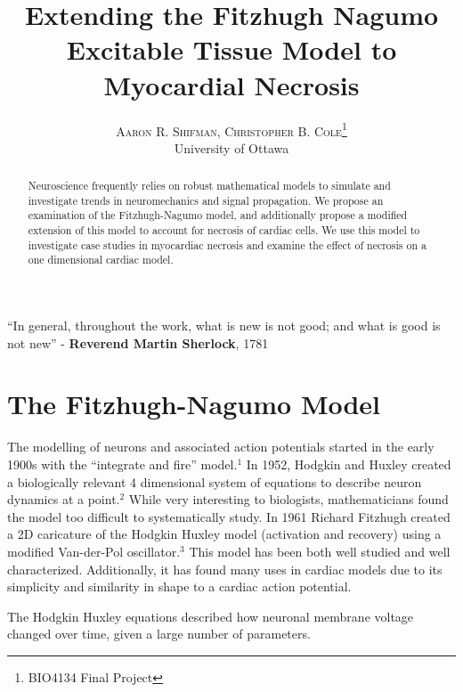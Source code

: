 \documentclass[11pt]{report}
\title{\vspace{-15mm}\fontsize{24pt}{10pt}\selectfont\textbf{Extending the Fitzhugh Nagumo Excitable Tissue Model to Myocardial Necrosis}} %
\author{
\large
\textsc{Aaron R. Shifman, Christopher B. Cole}\thanks{BIO4134 Final Project}\\[2mm] %
\normalsize University of Ottawa \\ %
\vspace{-5mm}
}
\date{}
\newenvironment{dedication}
  {\clearpage           %
   \thispagestyle{empty}%
   \vspace*{\stretch{1}}%
   \itshape             %
   \raggedleft          %
  }
  {\par %
   \vspace{\stretch{3}} %
   \clearpage           %
  }
\begin{document}
\maketitle %

\thispagestyle{fancy} %


\begin{dedication}
``In general, throughout the work, what is new is not good; and what is good is not new'' - \textbf{Reverend Martin Sherlock}, 1781 
\end{dedication}

\begin{abstract}

Neuroscience frequently relies on robust mathematical models to simulate and investigate trends in neuromechanics and signal propagation. We propose an examination of the Fitzhugh-Nagumo model, and additionally propose a modified extension of this model to account for necrosis of cardiac cells. We use this model to investigate case studies in myocardiac necrosis and examine the effect of necrosis on a one dimensional cardiac model. 
\end{abstract}


\newpage

\tableofcontents

\newpage

\listoffigures

\newpage

\chapter{The Fitzhugh-Nagumo Model}

The modelling of neurons and associated action potentials started in the early 1900s with the ``integrate and fire'' model.$^1$ In 1952, Hodgkin and Huxley created a biologically relevant 4 dimensional system of equations to describe neuron dynamics at a point.$^2$ While very interesting to biologists, mathematicians found the model too difficult to systematically study. In 1961 Richard Fitzhugh created a 2D caricature of the Hodgkin Huxley model (activation and recovery) using a modified Van-der-Pol oscillator.$^3$ This model has been both well studied and well characterized. Additionally, it has found many uses in cardiac models due to its simplicity and similarity in shape to a cardiac action potential. 

The Hodgkin Huxley equations described how neuronal membrane voltage changed over time, given a large number of parameters. 
\end{document}

